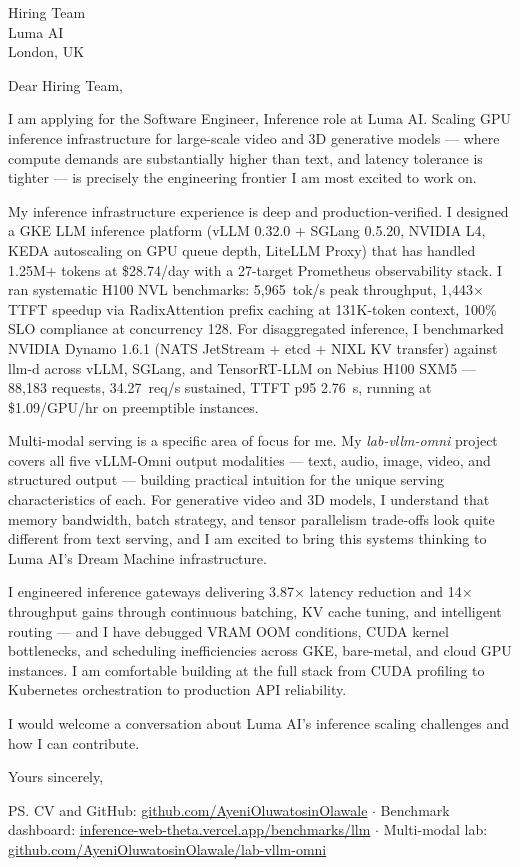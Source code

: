 \documentclass[12pt,a4paper]{letter}
\date{26 November 2026}
\begin{document}
\begin{letter}{Hiring Team \\ Luma AI \\ London, UK}

\opening{Dear Hiring Team,}

I am applying for the Software Engineer, Inference role at Luma AI. Scaling GPU inference infrastructure for large-scale video and 3D generative models — where compute demands are substantially higher than text, and latency tolerance is tighter — is precisely the engineering frontier I am most excited to work on.

My inference infrastructure experience is deep and production-verified. I designed a GKE LLM inference platform (vLLM 0.32.0 + SGLang 0.5.20, NVIDIA L4, KEDA autoscaling on GPU queue depth, LiteLLM Proxy) that has handled 1.25M+ tokens at \$28.74/day with a 27-target Prometheus observability stack. I ran systematic H100 NVL benchmarks: 5,965~tok/s peak throughput, 1,443$\times$ TTFT speedup via RadixAttention prefix caching at 131K-token context, 100\% SLO compliance at concurrency 128. For disaggregated inference, I benchmarked NVIDIA Dynamo 1.6.1 (NATS JetStream + etcd + NIXL KV transfer) against llm-d across vLLM, SGLang, and TensorRT-LLM on Nebius H100 SXM5 — 88,183 requests, 34.27~req/s sustained, TTFT p95 2.76~s, running at \$1.09/GPU/hr on preemptible instances.

Multi-modal serving is a specific area of focus for me. My \textit{lab-vllm-omni} project covers all five vLLM-Omni output modalities — text, audio, image, video, and structured output — building practical intuition for the unique serving characteristics of each. For generative video and 3D models, I understand that memory bandwidth, batch strategy, and tensor parallelism trade-offs look quite different from text serving, and I am excited to bring this systems thinking to Luma AI's Dream Machine infrastructure.

I engineered inference gateways delivering 3.87$\times$ latency reduction and 14$\times$ throughput gains through continuous batching, KV cache tuning, and intelligent routing — and I have debugged VRAM OOM conditions, CUDA kernel bottlenecks, and scheduling inefficiencies across GKE, bare-metal, and cloud GPU instances. I am comfortable building at the full stack from CUDA profiling to Kubernetes orchestration to production API reliability.

I would welcome a conversation about Luma AI's inference scaling challenges and how I can contribute.

\closing{Yours sincerely,}

\ps{CV and GitHub: \href{https://github.com/AyeniOluwatosinOlawale}{github.com/AyeniOluwatosinOlawale} $\cdot$ Benchmark dashboard: \href{https://inference-web-theta.vercel.app/benchmarks/llm}{inference-web-theta.vercel.app/benchmarks/llm} $\cdot$ Multi-modal lab: \href{https://github.com/AyeniOluwatosinOlawale/lab-vllm-omni}{github.com/AyeniOluwatosinOlawale/lab-vllm-omni}}

\end{letter}
\end{document}
